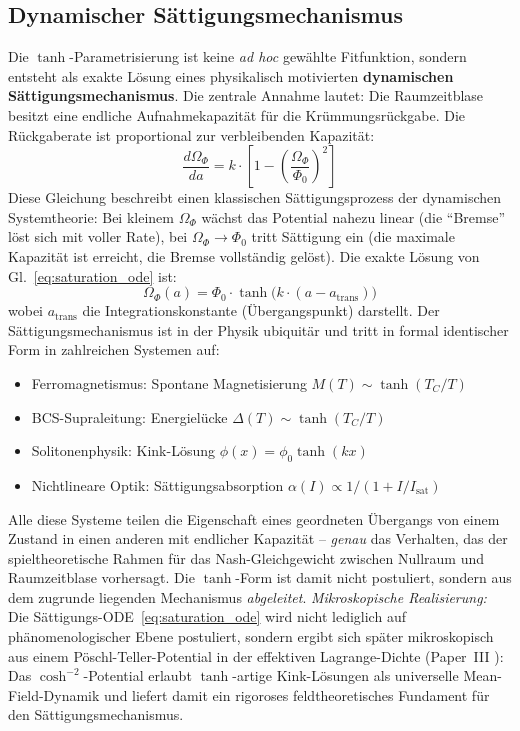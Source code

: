 \documentclass[aps,prd,twocolumn,superscriptaddress,nofootinbib]{revtex4-2}
\begin{document}
\subsection{Dynamischer Sättigungsmechanismus}
\label{subsec:saturation}

Die $\tanh$-Parametrisierung ist keine \textit{ad hoc} gewählte Fitfunktion, sondern entsteht als exakte Lösung eines physikalisch motivierten \textbf{dynamischen Sättigungsmechanismus}. Die zentrale Annahme lautet: Die Raumzeitblase besitzt eine endliche Aufnahmekapazität für die Krümmungsrückgabe. Die Rückgaberate ist proportional zur verbleibenden Kapazität:
\begin{equation}
\frac{d\Omega_\Phi}{da} = k \cdot \left[1 - \left(\frac{\Omega_\Phi}{\Phi_0}\right)^{\!2}\right]
\label{eq:saturation_ode}
\end{equation}
Diese Gleichung beschreibt einen klassischen Sättigungsprozess der dynamischen Systemtheorie: Bei kleinem $\Omega_\Phi$ wächst das Potential nahezu linear (die ``Bremse'' löst sich mit voller Rate), bei $\Omega_\Phi \to \Phi_0$ tritt Sättigung ein (die maximale Kapazität ist erreicht, die Bremse vollständig gelöst). Die exakte Lösung von Gl.~\eqref{eq:saturation_ode} ist:
\begin{equation}
\Omega_\Phi(a) = \Phi_0 \cdot \tanh\!\big(k\cdot(a - a_{\mathrm{trans}})\big)
\end{equation}
wobei $a_{\mathrm{trans}}$ die Integrationskonstante (Übergangspunkt) darstellt. Der Sättigungsmechanismus ist in der Physik ubiquitär und tritt in formal identischer Form in zahlreichen Systemen auf:
\begin{itemize}
\item Ferromagnetismus: Spontane Magnetisierung $M(T) \sim \tanh(T_C/T)$
\item BCS-Supraleitung: Energielücke $\Delta(T) \sim \tanh(T_C/T)$
\item Solitonenphysik: Kink-Lösung $\phi(x) = \phi_0 \tanh(kx)$
\item Nichtlineare Optik: Sättigungsabsorption $\alpha(I) \propto 1/(1 + I/I_{\mathrm{sat}})$
\end{itemize}
Alle diese Systeme teilen die Eigenschaft eines geordneten Übergangs von einem Zustand in einen anderen mit endlicher Kapazität -- \textit{genau} das Verhalten, das der spieltheoretische Rahmen für das Nash-Gleichgewicht zwischen Nullraum und Raumzeitblase vorhersagt. Die $\tanh$-Form ist damit nicht postuliert, sondern aus dem zugrunde liegenden Mechanismus \textit{abgeleitet}. \textit{Mikroskopische Realisierung:} Die Sättigungs-ODE~\eqref{eq:saturation_ode} wird nicht lediglich auf phänomenologischer Ebene postuliert, sondern ergibt sich später mikroskopisch aus einem Pöschl-Teller-Potential in der effektiven Lagrange-Dichte (Paper~III \cite{Geiger2026c}): Das $\cosh^{-2}$-Potential erlaubt $\tanh$-artige Kink-Lösungen als universelle Mean-Field-Dynamik und liefert damit ein rigoroses feldtheoretisches Fundament für den Sättigungsmechanismus.
\end{document}

